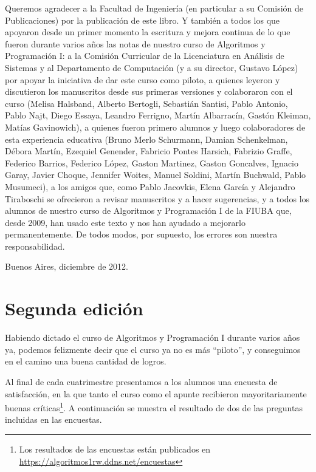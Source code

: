 Queremos agradecer a la Facultad de Ingeniería (en particular a su Comisión de Publicaciones)
por la publicación de este libro. Y también a todos los que apoyaron desde un primer momento
la escritura y mejora continua de lo que fueron durante varios años las notas de nuestro curso de
Algoritmos y Programación I: a la Comisión Curricular de la Licenciatura en Análisis de Sistemas y al
Departamento de Computación (y a su director, Gustavo López) por apoyar la iniciativa de dar este curso
como piloto, a quienes leyeron y discutieron los manuscritos desde sus primeras versiones y colaboraron
con el curso (Melisa Halsband, Alberto Bertogli, Sebastián Santisi, Pablo Antonio, Pablo Najt, Diego Essaya,
Leandro Ferrigno, Martín Albarracín, Gastón Kleiman, Matías Gavinowich), a quienes fueron primero alumnos y
luego colaboradores de esta experiencia educativa (Bruno Merlo Schurmann, Damian Schenkelman, Débora Martín,
Ezequiel Genender, Fabricio Pontes Harsich, Fabrizio Graffe, Federico Barrios, Federico López, Gaston
Martinez, Gaston Goncalves, Ignacio Garay, Javier Choque, Jennifer Woites, Manuel Soldini, Martín Buchwald,
Pablo Musumeci), a los amigos que, como Pablo Jacovkis, Elena García y Alejandro Tiraboschi se ofrecieron a
revisar manuscritos y a hacer sugerencias, y a todos los alumnos de nuestro curso de Algoritmos y
Programación I de la FIUBA que, desde 2009, han usado este texto y nos han ayudado a mejorarlo permanentemente.
De todos modos, por supuesto, los errores son nuestra responsabilidad.

\vspace{1cm}
\hfill Buenos Aires, diciembre de 2012.

\section*{Segunda edición}

Habiendo dictado el curso de Algoritmos y Programación I durante
varios años ya, podemos felizmente decir que el curso ya no es más ``piloto'',
y conseguimos en el camino una buena cantidad de logros.

Al final de cada cuatrimestre presentamos a los alumnos una encuesta de
satisfacción, en la que tanto el curso como el apunte recibieron
mayoritariamente buenas
críticas\footnote{Los resultados de las encuestas están publicados en
\url{https://algoritmos1rw.ddns.net/encuestas}}. A continuación se muestra el
resultado de dos de las preguntas incluidas en las encuestas.

